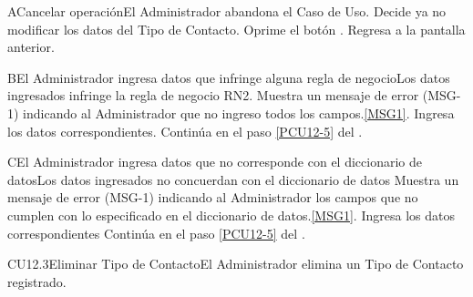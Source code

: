 		\begin{UCtrayectoriaA}{A}{Cancelar operación}{El Administrador abandona el Caso de Uso.}
			\UCpaso[\UCactor] Decide ya no modificar los datos del Tipo de Contacto.
			\UCpaso[\UCactor] Oprime el botón .
			\UCpaso Regresa a la pantalla anterior.
		\end{UCtrayectoriaA}
		
        \begin{UCtrayectoriaA}{B}{El Administrador ingresa datos que infringe alguna regla de negocio}{Los datos ingresados infringe la regla de negocio RN2.}
                        \UCpaso Muestra un mensaje de error (MSG-1) indicando al Administrador que no ingreso todos los campos.\ref{MSG1}.
			\UCpaso[\UCactor] Ingresa los datos correspondientes.
			\UCpaso Continúa en el paso \ref{PCU12-5} del .
	\end{UCtrayectoriaA}

        \begin{UCtrayectoriaA}{C}{El Administrador ingresa datos que no corresponde con el diccionario de datos}{Los datos ingresados no concuerdan con el diccionario de datos}
                        \UCpaso Muestra un mensaje de error (MSG-1) indicando al Administrador los campos que no cumplen con lo especificado en el diccionario de datos.\ref{MSG1}.
			\UCpaso[\UCactor] Ingresa los datos correspondientes
			\UCpaso Continúa en el paso \ref{PCU12-5} del .
	\end{UCtrayectoriaA}

	\begin{UseCase}{CU12.3}{Eliminar Tipo de Contacto}{El Administrador elimina un Tipo de Contacto registrado.}
	\end{UseCase}

